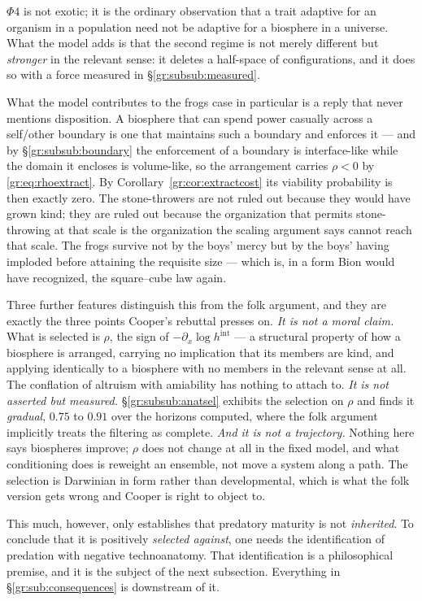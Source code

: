 \documentclass[11pt]{article}
\numberwithin{equation}{section}
\theoremstyle{plain}
\theoremstyle{definition}
\theoremstyle{remark}
\begin{document}
$\Phi4$ is not exotic; it is the ordinary observation that a trait
adaptive for an organism in a population need not be adaptive for a
biosphere in a universe. What the model adds is that the second regime
is not merely different but \emph{stronger} in the relevant sense: it
deletes a half-space of configurations, and it does so with a force
measured in \S\ref{gr:subsub:measured}.

What the model contributes to the frogs case in particular is a reply
that never mentions disposition. A biosphere that can spend power
casually across a self/other boundary is one that maintains such a
boundary and enforces it --- and by \S\ref{gr:subsub:boundary} the
enforcement of a boundary is interface-like while the domain it encloses
is volume-like, so the arrangement carries $\rho<0$ by
\eqref{gr:eq:rhoextract}. By Corollary~\ref{gr:cor:extractcost} its
viability probability is then exactly zero. The stone-throwers are not
ruled out because they would have grown kind; they are ruled out
because the organization that permits stone-throwing at that scale is
the organization the scaling argument says cannot reach that scale. The
frogs survive not by the boys' mercy but by the boys' having imploded
before attaining the requisite size --- which is, in a form Bion would
have recognized, the square--cube law again.

Three further features distinguish this from the folk argument, and they
are exactly the three points Cooper's rebuttal presses on. \emph{It is not
a moral claim.} What is selected is $\rho$, the sign of
$-\partial_x\log h^{\mathrm{int}}$ --- a structural property of how a
biosphere is arranged, carrying no implication that its members are
kind, and applying identically to a biosphere with no members in the
relevant sense at all. The conflation of altruism with amiability has
nothing to attach to. \emph{It is not asserted but measured.}
\S\ref{gr:subsub:anatsel} exhibits the selection on $\rho$ and finds it
\emph{gradual}, $0.75$ to $0.91$ over the horizons computed, where the folk argument implicitly treats the filtering as complete.
\emph{And it is not a trajectory.} Nothing here says biospheres improve;
$\rho$ does not change at all in the fixed model, and what conditioning
does is reweight an ensemble, not move a system along a path. The
selection is Darwinian in form rather than developmental, which is
what the folk version gets wrong and Cooper is right to object to.

This much, however, only establishes that predatory maturity is not
\emph{inherited}. To conclude that it is positively \emph{selected
against}, one needs the identification of predation with negative
technoanatomy. That identification is a philosophical premise, and it is
the subject of the next subsection. Everything in
\S\ref{gr:sub:consequences} is downstream of it.
\end{document}
